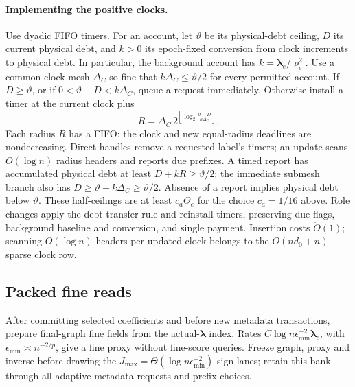 \documentclass[11pt]{article}
\theoremstyle{remark}
\newcommand{\llambda}{\boldsymbol{\lambda}}
\newcommand{\vvr}{\boldsymbol{\varrho}}
\renewcommand{\O}{\ddot{O}}
\begin{document}
\paragraph{Implementing the positive clocks.}
Use dyadic FIFO timers.
For an account, let $\vartheta$ be its physical-debt ceiling, $D$ its current
physical debt, and $k>0$ its epoch-fixed conversion from clock increments to
physical debt.
In particular, the background account has $k=\llambda_e/\vvr_e^2$.
Use a common clock mesh $\Delta_C$ so fine that $k\Delta_C\le\vartheta/2$ for
every permitted account.
If $D\ge\vartheta$, or if $0<\vartheta-D<k\Delta_C$, queue a request
immediately.
Otherwise install a timer at the current clock plus
\[
 R=\Delta_C\,2^{\left\lfloor
       \log_2\frac{\vartheta-D}{k\Delta_C}\right\rfloor}.
\]
Each radius $R$ has a FIFO: the clock and new equal-radius deadlines are
nondecreasing.
Direct handles remove a requested label's timers; an update scans $O(\log n)$ radius
headers and reports due prefixes.
A timed report has accumulated physical debt at least $D+kR\ge\vartheta/2$; the
immediate submesh branch also has $D\ge\vartheta-k\Delta_C\ge\vartheta/2$.
Absence of a report implies physical debt below $\vartheta$.
These half-ceilings are at least $c_a\Theta_e$ for the choice $c_a=1/16$ above.
Role changes apply the debt-transfer rule and reinstall timers, preserving due
flags, background baseline and conversion, and single payment.
Insertion costs $\O(1)$; scanning $O(\log n)$ headers per updated clock belongs to
the $O(nd_0+n)$ sparse clock row.

\subsection{Packed fine reads}

After committing selected coefficients and before new metadata transactions,
prepare final-graph fine fields from the actual-$\llambda$ index.
Rates $C\log n\epsilon_{\min}^{-2}\llambda_e$, with $\epsilon_{\min}\asymp n^{-2/p}$,
give a fine proxy without fine-score queries.
Freeze graph, proxy and inverse before drawing the
$J_{\max}=\Theta(\log n\epsilon_{\min}^{-2})$ sign lanes; retain this bank through
all adaptive metadata requests and prefix choices.
\end{document}
